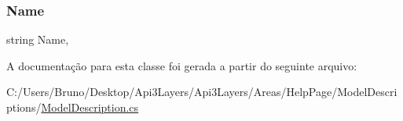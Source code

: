 \subsubsection{\texorpdfstring{Name}{Name}}
{\footnotesize\ttfamily string Name\hspace{0.3cm}{\ttfamily [get]}, {\ttfamily [set]}}



A documentação para esta classe foi gerada a partir do seguinte arquivo\+:\begin{DoxyCompactItemize}
\item 
C\+:/\+Users/\+Bruno/\+Desktop/\+Api3\+Layers/\+Api3\+Layers/\+Areas/\+Help\+Page/\+Model\+Descriptions/\hyperlink{ModelDescription_8cs}{Model\+Description.\+cs}\end{DoxyCompactItemize}

